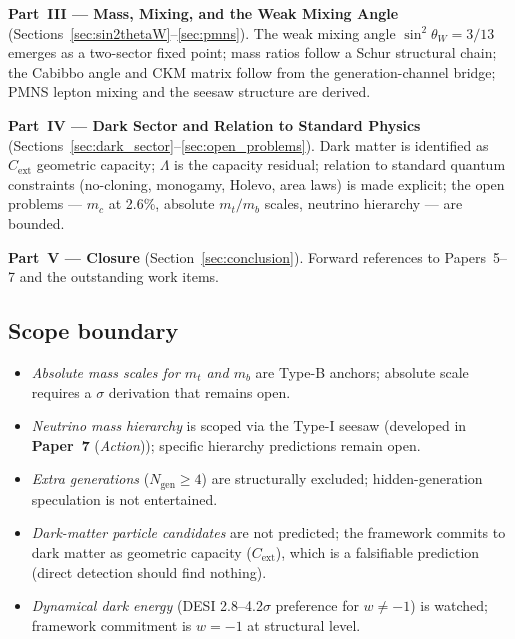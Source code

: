 \documentclass[11pt]{article}
\newcommand{\paperref}[2]{\textbf{Paper~#1} (\textit{#2})}
\theoremstyle{definition}
\begin{document}
\textbf{Part~III --- Mass, Mixing, and the Weak Mixing Angle} (Sections~\ref{sec:sin2thetaW}--\ref{sec:pmns}). The weak mixing angle $\sin^2\theta_W = 3/13$ emerges as a two-sector fixed point; mass ratios follow a Schur structural chain; the Cabibbo angle and CKM matrix follow from the generation-channel bridge; PMNS lepton mixing and the seesaw structure are derived.

\textbf{Part~IV --- Dark Sector and Relation to Standard Physics} (Sections~\ref{sec:dark_sector}--\ref{sec:open_problems}). Dark matter is identified as $C_{\mathrm{ext}}$ geometric capacity; $\Lambda$ is the capacity residual; relation to standard quantum constraints (no-cloning, monogamy, Holevo, area laws) is made explicit; the open problems --- $m_c$ at 2.6\%, absolute $m_t/m_b$ scales, neutrino hierarchy --- are bounded.

\textbf{Part~V --- Closure} (Section~\ref{sec:conclusion}). Forward references to Papers~5--7 and the outstanding work items.

\subsection{Scope boundary}\label{sec:intro_scope_boundary}

\begin{tcolorbox}[apfbox, title={What Paper 4 does not claim}]
\begin{itemize}
    \item \emph{Absolute mass scales for $m_t$ and $m_b$} are Type-B anchors; absolute scale requires a $\sigma$ derivation that remains open.
    \item \emph{Neutrino mass hierarchy} is scoped via the Type-I seesaw (developed in \paperref{7}{Action}); specific hierarchy predictions remain open.
    \item \emph{Extra generations} ($N_{\mathrm{gen}} \geq 4$) are structurally excluded; hidden-generation speculation is not entertained.
    \item \emph{Dark-matter particle candidates} are not predicted; the framework commits to dark matter as geometric capacity ($C_{\mathrm{ext}}$), which is a falsifiable prediction (direct detection should find nothing).
    \item \emph{Dynamical dark energy} (DESI 2.8--4.2$\sigma$ preference for $w \neq -1$) is watched; framework commitment is $w = -1$ at structural level.
\end{itemize}
\end{tcolorbox}
\end{document}
